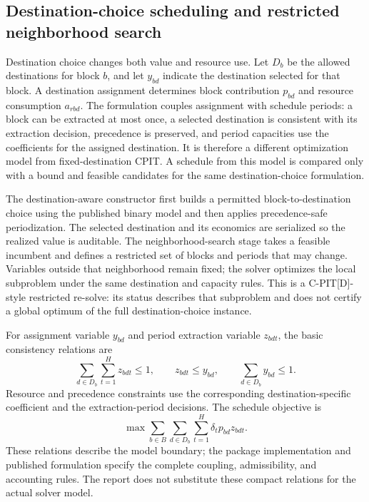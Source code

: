\subsection{Destination-choice scheduling and restricted neighborhood search}
\label{sec:method-destination}
Destination choice changes both value and resource use. Let $D_b$ be the allowed destinations for block $b$, and let $y_{bd}$ indicate the destination selected for that block. A destination assignment determines block contribution $p_{bd}$ and resource consumption $a_{rbd}$. The formulation couples assignment with schedule periods: a block can be extracted at most once, a selected destination is consistent with its extraction decision, precedence is preserved, and period capacities use the coefficients for the assigned destination. It is therefore a different optimization model from fixed-destination CPIT. A schedule from this model is compared only with a bound and feasible candidates for the same destination-choice formulation.

The destination-aware constructor first builds a permitted block-to-destination choice using the published binary model and then applies precedence-safe periodization. The selected destination and its economics are serialized so the realized value is auditable. The neighborhood-search stage takes a feasible incumbent and defines a restricted set of blocks and periods that may change. Variables outside that neighborhood remain fixed; the solver optimizes the local subproblem under the same destination and capacity rules. This is a C-PIT[D]-style restricted re-solve: its status describes that subproblem and does not certify a global optimum of the full destination-choice instance.

For assignment variable $y_{bd}$ and period extraction variable $z_{bdt}$, the basic consistency relations are
\begin{equation}
 \sum_{d\in D_b}\sum_{t=1}^{H}z_{bdt}\leq1,\qquad
 z_{bdt}\leq y_{bd},\qquad
 \sum_{d\in D_b}y_{bd}\leq1.
\end{equation}
Resource and precedence constraints use the corresponding destination-specific coefficient and the extraction-period decisions. The schedule objective is
\begin{equation}
 \max\sum_{b\in B}\sum_{d\in D_b}\sum_{t=1}^{H}\delta_t p_{bd}z_{bdt}.
\end{equation}
These relations describe the model boundary; the package implementation and published formulation specify the complete coupling, admissibility, and accounting rules. The report does not substitute these compact relations for the actual solver model.

